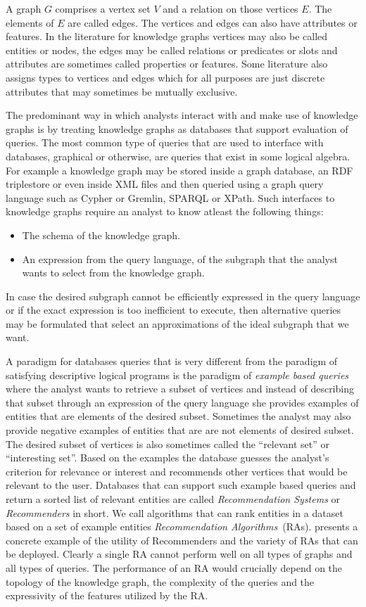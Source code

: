 A graph $G$ comprises a vertex set $V$ and a relation
on those vertices $E$. The elements of $E$ are called edges.
The vertices and edges can also have attributes or features.
In the literature for knowledge
graphs vertices may also be called entities or nodes, the edges may be
called relations or predicates or slots and attributes are sometimes called properties or
features. Some literature also assigns types to
vertices and edges which for all purposes are just discrete attributes that may
sometimes be mutually exclusive.

The predominant way in which analysts interact with and make use of knowledge
graphs is by treating knowledge graphs as databases that support evaluation
of queries. The most common type of queries that are used to interface with
databases, graphical or otherwise, are queries that exist in some logical
algebra. For example a knowledge graph may be stored inside a graph database,
an RDF {triplestore} or even inside XML files and then queried using a graph
query language such as Cypher or Gremlin, SPARQL or XPath. Such interfaces to
knowledge graphs require an analyst to know atleast the following things:
\begin{itemize}
\item The schema of the knowledge graph.
\item An expression from the query language, of the subgraph that the
  analyst wants to select from the knowledge graph.
\end{itemize}
In case the desired subgraph cannot be efficiently expressed in the query
language or if the exact expression is too inefficient to execute, then
alternative queries may be formulated that select an approximations of
the ideal subgraph that we want.

A paradigm for databases queries that is very different from the paradigm
of satisfying descriptive logical programs is the paradigm of
\textit{example based queries} where the analyst wants to retrieve a subset of
vertices and instead of describing that subset through an expression of the query
language she provides {examples} of entities that are elements of
 the desired subset. Sometimes the analyst may also provide negative examples of
 entities that are are not elements of desired subset. The desired subset of
 vertices is also sometimes called the ``{relevant set}'' or
 ``{interesting set}''. Based on the  examples the database guesses the
 analyst's criterion for relevance or interest and {recommends} other
 vertices that would be relevant to the user. Databases that can support such
 example based queries and return a sorted list of relevant entities are called
\textit{Recommendation Systems} or \textit{Recommenders} in short. We call algorithms
that can rank entities in a dataset based on a set of example entities
\textit{Recommendation Algorithms}~(RAs).  presents a
concrete example of the utility of Recommenders and the variety of RAs that
can be deployed. Clearly a single RA cannot perform well on all types of graphs and all types of
queries. The performance of an RA would crucially depend on the topology of the
knowledge graph, the complexity of the queries and the expressivity of the
features utilized by the RA.

